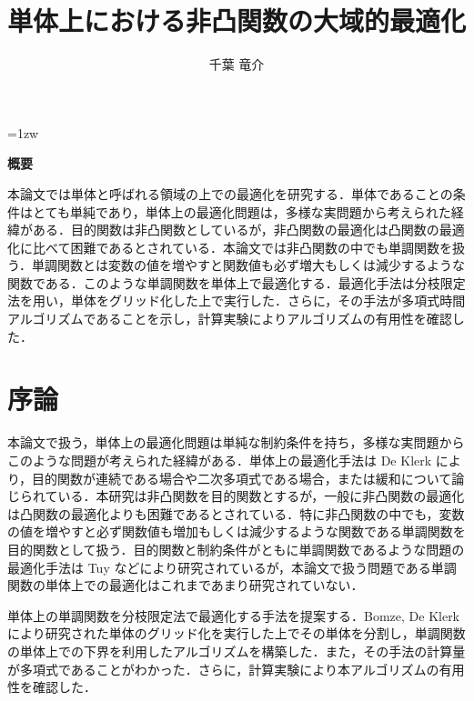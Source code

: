 \documentclass[a4paper,11pt]{jreport}
\title{単体上における非凸関数の大域的最適化}
\author{千葉 竜介}
\begin{document}
\maketitle
\thispagestyle{empty}
\newpage

\thispagestyle{empty}
\vspace*{20pt plus 1fil}
\parindent=1zw
\noindent
\begin{center}
{\bf 概要}
\vspace{5mm}
\end{center}

本論文では単体と呼ばれる領域の上での最適化を研究する．単体であることの条件はとても単純であり，単体上の最適化問題は，多様な実問題から考えられた経緯がある．目的関数は非凸関数としているが，非凸関数の最適化は凸関数の最適化に比べて困難であるとされている．本論文では非凸関数の中でも単調関数を扱う．単調関数とは変数の値を増やすと関数値も必ず増大もしくは減少するような関数である．このような単調関数を単体上で最適化する．最適化手法は分枝限定法を用い，単体をグリッド化した上で実行した．さらに，その手法が多項式時間アルゴリズムであることを示し，計算実験によりアルゴリズムの有用性を確認した．

\par
\vspace{0pt plus 1fil}
\newpage

\tableofcontents
\listoffigures

\pagebreak
\setcounter{page}{1}

\chapter{序論}

本論文で扱う，単体上の最適化問題は単純な制約条件を持ち，多様な実問題からこのような問題が考えられた経緯がある．単体上の最適化手法は De Klerk \cite{deklerk_survey} により，目的関数が連続である場合や二次多項式である場合，または緩和について論じられている．本研究は非凸関数を目的関数とするが，一般に非凸関数の最適化は凸関数の最適化よりも困難であるとされている．特に非凸関数の中でも，変数の値を増やすと必ず関数値も増加もしくは減少するような関数である単調関数を目的関数として扱う．目的関数と制約条件がともに単調関数であるような問題の最適化手法は Tuy \cite{tuy} などにより研究されているが，本論文で扱う問題である単調関数の単体上での最適化はこれまであまり研究されていない．\par
単体上の単調関数を分枝限定法で最適化する手法を提案する．Bomze, De Klerk \cite{bomze} により研究された単体のグリッド化を実行した上でその単体を分割し，単調関数の単体上での下界を利用したアルゴリズムを構築した．また，その手法の計算量が多項式であることがわかった．さらに，計算実験により本アルゴリズムの有用性を確認した．
\end{document}
